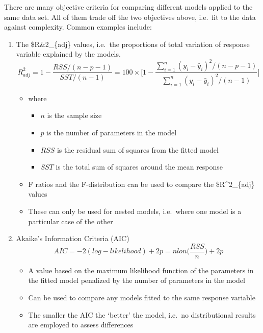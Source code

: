 \documentclass[]{article}
\providecommand{\tightlist}{%
  \setlength{\itemsep}{0pt}\setlength{\parskip}{0pt}}
\begin{document}
There are many objective criteria for comparing different models applied
to the same data set. All of them trade off the two objectives above,
i.e.~fit to the data against complexity. Common examples include:

\begin{enumerate}
\def\labelenumi{\arabic{enumi}.}
\tightlist
\item
  The \$R\&2\_\{adj\} values, i.e.~the proportions of total variation of
  response variable explained by the models.
  \[R^2_{adj} = 1 - \frac{RSS/(n-p-1)}{SST/(n-1)} = 100 \times \Bigg[ 1 - \frac{ \sum^n_{i=1} (y_i - \hat{y}_i)^2 / (n-p-1)}{ \sum^n_{i=1} (y_i - \bar{y}_i)^2 / (n-1)} \Bigg]\]

  \begin{itemize}
  \tightlist
  \item
    where

    \begin{itemize}
    \tightlist
    \item
      \(n\) is the sample size
    \item
      \(p\) is the number of parameters in the model
    \item
      \(RSS\) is the residual sum of squares from the fitted model
    \item
      \(SST\) is the total sum of squares around the mean response
    \end{itemize}
  \item
    F ratios and the F-distribution can be used to compare the
    \$R\^{}2\_\{adj\} values
  \item
    These can only be used for nested models, i.e.~where one model is a
    particular case of the other
  \end{itemize}
\item
  Akaike's Information Criteria (AIC)
  \[AIC = -2(log-likelihood) + 2p = nlon \Bigg( \frac{RSS}{n} \Bigg) + 2p\]

  \begin{itemize}
  \tightlist
  \item
    A value based on the maximum likelihood function of the parameters
    in the fitted model penalized by the number of parameters in the
    model
  \item
    Can be used to compare any models fitted to the same response
    variable
  \item
    The smaller the AIC the `better' the model, i.e.~no distributional
    results are employed to assess differences
  \end{itemize}
\end{enumerate}
\end{document}
